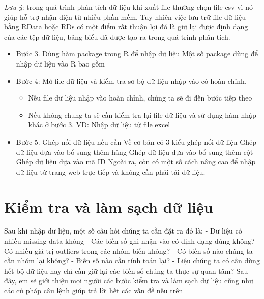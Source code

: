 \documentclass[
]{book}
\providecommand{\tightlist}{%
  \setlength{\itemsep}{0pt}\setlength{\parskip}{0pt}}
\theoremstyle{definition}
\theoremstyle{definition}
\theoremstyle{definition}
\theoremstyle{definition}
\theoremstyle{remark}
\begin{document}
\emph{Lưu ý}: trong quá trình phân tích dữ liệu khi xuất file thường chọn file csv vì nó giúp hỗ trợ nhận diện từ nhiều phần mềm. Tuy nhiên việc lưu trữ file dữ liệu bằng RData hoặc RDs có một điểm rất thuận lợi đó là giữ lại được định dạng của các tệp dữ liệu, bảng biểu đã được tạo ra trong quá trình phân tích.

\begin{itemize}
\item
  Bước 3. Dùng hàm package trong R để nhập dữ liệu Một số package dùng để nhập dữ liệu vào R bao gồm
\item
  Bước 4: Mở file dữ liệu và kiểm tra sơ bộ dữ liệu nhập vào có hoàn chỉnh.

  \begin{itemize}
  \tightlist
  \item
    Nếu file dữ liệu nhập vào hoàn chỉnh, chúng ta sẽ đi đến bước tiếp theo
  \item
    Nếu không chung ta sẽ cần kiểm tra lại file dữ liệu và sử dụng hàm nhập khác ở bước 3. VD: Nhập dữ liệu từ file excel\\
  \end{itemize}
\item
  Bước 5. Ghép nối dữ liệu nếu cần Về cơ bản có 3 kiểu ghép nối dữ liệu Ghép dữ liệu dựa vào bổ sung thêm hàng Ghép dữ liệu dựa vào bổ sung thêm cột Ghép dữ liệu dựa vào mã ID Ngoài ra, còn có một số cách nâng cao để nhập dữ liệu từ trang web trực tiếp và không cần phải tải dữ liệu.
\end{itemize}

\hypertarget{kiux1ec3m-tra-vuxe0-luxe0m-sux1ea1ch-dux1eef-liux1ec7u}{%
\section{Kiểm tra và làm sạch dữ liệu}\label{kiux1ec3m-tra-vuxe0-luxe0m-sux1ea1ch-dux1eef-liux1ec7u}}

Sau khi nhập dữ liệu, một số câu hỏi chúng ta cần đặt ra đó là: - Dữ liệu có nhiều missing data không - Các biến số ghi nhận vào có định dạng đúng không? - Có nhiều giá trị outliers trong các nhóm biến không? - Có biến số nào chúng ta cần nhóm lại không? - Biến số nào cần tính toán lại? - Liệu chúng ta có cần dùng hết bộ dữ liệu hay chỉ cần giữ lại các biến số chúng ta thực sự quan tâm? Sau đây, em sẽ giới thiệu mọi người các bước kiểm tra và làm sạch dữ liệu cũng như các cú pháp câu lệnh giúp trả lời hết các vấn đề nếu trên
\end{document}
